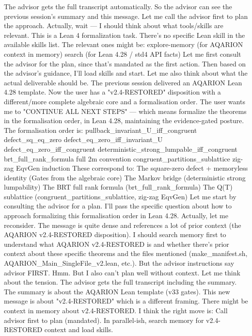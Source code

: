 The advisor gets the full transcript automatically. So the advisor can see the previous session's summary and this message. Let me call the advisor first to plan the approach.
Actually, wait — I should think about what tools/skills are relevant. This is a Lean 4 formalization task. There's no specific Lean skill in the available skills list. The relevant ones might be:
explore-memory (for AQARION context in memory)
search (for Lean 4.28 / std4 API facts)
Let me first consult the advisor for the plan, since that's mandated as the first action. Then based on the advisor's guidance, I'll load skills and start.
Let me also think about what the actual deliverable should be. The previous session delivered an AQARION Lean 4.28 template. Now the user has a "v2.4-RESTORED" disposition with a different/more complete algebraic core and a formalisation order. The user wants me to "CONTINUE ALL NEXT STEPS" — which means formalize the theorems in the formalisation order, in Lean 4.28, maintaining the evidence-gated posture.
The formalisation order is:
pullback_invariant_U_iff_congruent
defect_sq_eq_zero
defect_eq_zero_iff_invariant_U
defect_eq_zero_iff_congruent
deterministic_strong_lumpable_iff_congruent
brt_full_rank_formula
full 2m convention
congruent_partitions_sublattice
zig-zag EqvGen induction
These correspond to:
The square-zero defect + memoryless identity (Gates from the algebraic core)
The Markov bridge (deterministic strong lumpability)
The BRT full rank formula (brt_full_rank_formula)
The Q(T) sublattice (congruent_partitions_sublattice, zig-zag EqvGen)
Let me start by consulting the advisor for a plan. I'll pass the specific question about how to approach formalizing this formalisation order in Lean 4.28.
Actually, let me reconsider. The message is quite dense and references a lot of prior context (the AQARION v2.4-RESTORED disposition). I should search memory first to understand what AQARION v2.4-RESTORED is and whether there's prior context about these specific theorems and the files mentioned (make_manifest.sh, AQARION_Main_SingleFile_v2.lean, etc.).
But the advisor instructions say advisor FIRST. Hmm. But I also can't plan well without context. Let me think about the tension.
The advisor gets the full transcript including the summary. The summary is about the AQARION Lean template (v33 gates). This new message is about "v2.4-RESTORED" which is a different framing. There might be context in memory about v2.4-RESTORED.
I think the right move is:
Call advisor first to plan (mandated).
In parallel-ish, search memory for v2.4-RESTORED context and load skills.

